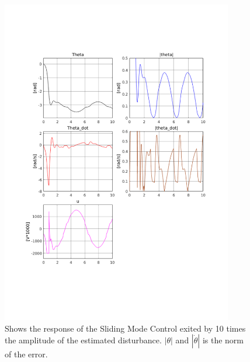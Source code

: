 \begin{figure}[H]
        \centering
        \includegraphics[width=0.9\textwidth,trim=0.5cm 5cm 0.5cm 4cm, clip]{smc_extreme_dis.pdf}
        \caption{Shows the response of the Sliding Mode Control exited by 10 times the amplitude of the estimated disturbance. $|\theta|$ and $|\dot{\theta}|$ is the norm of the error.}
        \label{fig:smc_extreme}
\end{figure}

